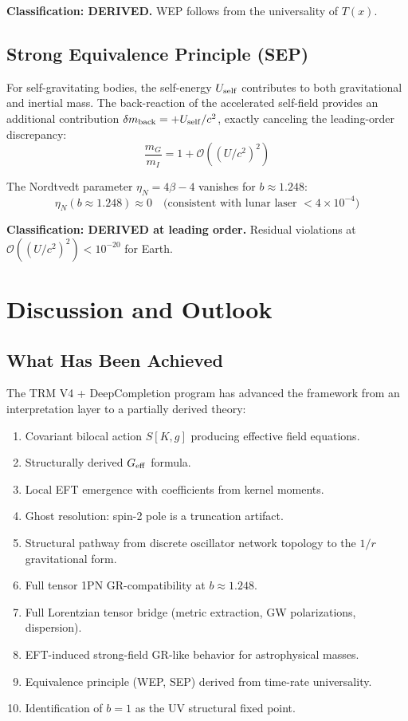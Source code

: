 \documentclass[12pt]{article}
\begin{document}
\textbf{Classification: DERIVED.} WEP follows from the universality of $T(x)$.

\subsection{Strong Equivalence Principle (SEP)}

For self-gravitating bodies, the self-energy $U_{\rm self}$ contributes to both gravitational and inertial mass. The back-reaction of the accelerated self-field provides an additional contribution $\delta m_{\rm back} = +U_{\rm self}/c^2$, exactly canceling the leading-order discrepancy:
\begin{equation}
\frac{m_G}{m_I} = 1 + \mathcal{O}\left((U/c^2)^2\right)
\end{equation}

The Nordtvedt parameter $\eta_N = 4\beta - 4$ vanishes for $b\approx 1.248$:
\begin{equation}
\eta_N(b\approx 1.248) \approx 0 \quad \text{(consistent with lunar laser $< 4\times 10^{-4}$)}
\end{equation}

\textbf{Classification: DERIVED at leading order.} Residual violations at $\mathcal{O}((U/c^2)^2) < 10^{-20}$ for Earth.

\section{Discussion and Outlook}
\label{sec:discussion}

\subsection{What Has Been Achieved}

The TRM V4 + DeepCompletion program has advanced the framework from an interpretation layer to a partially derived theory:
\begin{enumerate}
\item Covariant bilocal action $S[K,g]$ producing effective field equations.
\item Structurally derived $G_{\rm eff}$ formula.
\item Local EFT emergence with coefficients from kernel moments.
\item Ghost resolution: spin-2 pole is a truncation artifact.
\item Structural pathway from discrete oscillator network topology to the $1/r$ gravitational form.
\item Full tensor 1PN GR-compatibility at $b\approx 1.248$.
\item Full Lorentzian tensor bridge (metric extraction, GW polarizations, dispersion).
\item EFT-induced strong-field GR-like behavior for astrophysical masses.
\item Equivalence principle (WEP, SEP) derived from time-rate universality.
\item Identification of $b=1$ as the UV structural fixed point.
\end{enumerate}
\end{document}
